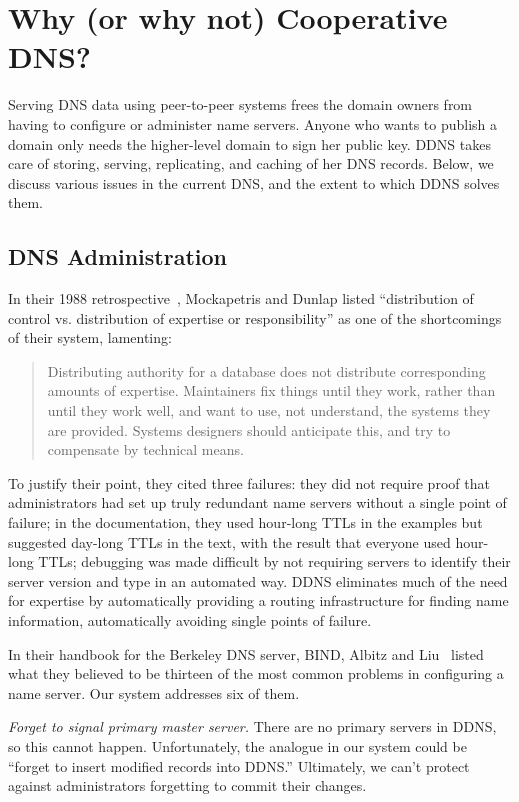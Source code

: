 \section{Why (or why not) Cooperative DNS?}

Serving DNS data using peer-to-peer systems 
frees the domain owners from having to configure
or administer name servers. Anyone who 
wants to publish a domain only needs the higher-level
domain to sign her public key. DDNS takes care of
storing, serving, replicating, and caching of her DNS records.
Below, we discuss various issues in the current DNS, 
and the extent to which DDNS solves them.

\subsection{DNS Administration}

In their 1988 retrospective~\cite{dns}, Mockapetris and Dunlap
listed ``distribution of control vs. distribution of expertise
or responsibility'' as one of the shortcomings of their system,
lamenting:
\begin{quote}
Distributing authority for a database does not distribute
corresponding amounts of expertise.  Maintainers fix things
until they work, rather than until they work well, and want to use,
not understand, the systems they are provided.
Systems designers should anticipate this, and try to
compensate by technical means.
\end{quote}
To justify their point, they cited three failures:
they did not require proof that administrators had set up
truly redundant name servers without a single point of failure;
in the documentation, they used hour-long TTLs 
in the examples but suggested
day-long TTLs in the text, with the result that everyone used
hour-long TTLs; debugging was made difficult by not requiring
servers to identify their server version and type in an automated way.
DDNS eliminates much of the need for expertise by 
automatically providing a routing infrastructure for finding 
name information, automatically avoiding single points of 
failure.

In their handbook for the Berkeley DNS server, BIND,
Albitz and Liu~\cite{dns-bind} listed what they believed to be
thirteen of the most common problems in configuring
a name server.
Our system addresses six of them.

{\em Forget to signal primary master server.}
There are no primary servers in DDNS, so this cannot happen.
Unfortunately, the analogue in our system could be ``forget to
insert modified records into DDNS.''
Ultimately, we can't protect against administrators
forgetting to commit their changes.

